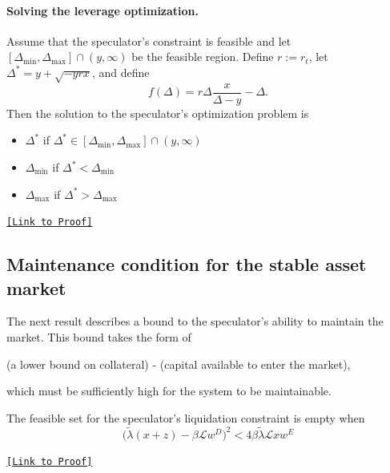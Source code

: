 \paragraph{Solving the leverage optimization.}
\begin{proposition}\label{prop:leverage_sol}
	Assume that the speculator's constraint is feasible and let $[\Delta_{\min}, \Delta_{\max}] \cap (y, \infty)$ be the feasible region. Define $r:=r_t$, let $\Delta^* = y + \sqrt{-yrx}$, and define
	$$f(\Delta) = r\Delta \frac{x}{\Delta - y} - \Delta.$$
	Then the solution to the speculator's optimization problem is
	\begin{itemize}
		\item $\Delta^*$ if $\Delta^* \in [\Delta_{\min}, \Delta_{\max}] \cap (y, \infty)$
		\item $\Delta_{\min}$ if $\Delta^*<\Delta_{\min}$
		\item $\Delta_{\max}$ if $\Delta^*>\Delta_{\max}$
	\end{itemize}
\end{proposition}

\begin{center} \hyperlink{pf:leverage_sol}{\texttt{[Link to Proof]}} \end{center}






\subsection{Maintenance condition for the stable asset market}

The next result describes a bound to the speculator's ability to maintain the market. This bound takes the form of
\begin{center}
	(a lower bound on collateral) - (capital available to enter the market),
\end{center}
which must be sufficiently high for the system to be maintainable.
\begin{proposition}\label{prop:feasible_condition}
	The feasible set for the speculator's liquidation constraint is empty when
	$$\Big(\tilde \lambda(x+z) - \beta\mathcal{L} w^D \Big)^2 < 4\beta \tilde\lambda \mathcal{L}xw^E$$
\end{proposition}

\begin{center} \hyperlink{pf:feasible_condition}{\texttt{[Link to Proof]}} \end{center}

